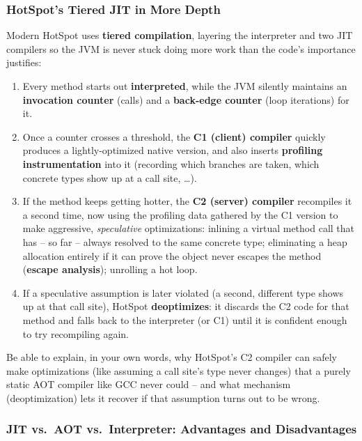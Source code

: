 \documentclass[full-course-notes.tex]{subfiles}
\begin{document}
\subsubsection{HotSpot's Tiered JIT in More Depth}

\dbtag Modern HotSpot uses \textbf{tiered compilation}, layering the interpreter and two JIT
compilers so the JVM is never stuck doing more work than the code's importance justifies:

\begin{enumerate}
  \item Every method starts out \textbf{interpreted}, while the JVM silently maintains an
  \textbf{invocation counter} (calls) and a \textbf{back-edge counter} (loop iterations) for it.
  \item Once a counter crosses a threshold, the \textbf{C1 (client) compiler} quickly produces a
  lightly-optimized native version, and also inserts \textbf{profiling instrumentation} into it
  (recording which branches are taken, which concrete types show up at a call site, \dots).
  \item If the method keeps getting hotter, the \textbf{C2 (server) compiler} recompiles it a
  second time, now using the profiling data gathered by the C1 version to make aggressive,
  \emph{speculative} optimizations: inlining a virtual method call that has -- so far -- always
  resolved to the same concrete type; eliminating a heap allocation entirely if it can prove the
  object never escapes the method (\textbf{escape analysis}); unrolling a hot loop.
  \item If a speculative assumption is later violated (a second, different type shows up at that
  call site), HotSpot \textbf{deoptimizes}: it discards the C2 code for that method and falls
  back to the interpreter (or C1) until it is confident enough to try recompiling again.
\end{enumerate}

\begin{examfocus}
Be able to explain, in your own words, why HotSpot's C2 compiler can safely make optimizations
(like assuming a call site's type never changes) that a purely static AOT compiler like GCC
never could -- and what mechanism (deoptimization) lets it recover if that assumption turns out
to be wrong.
\end{examfocus}

\subsubsection{JIT vs.\ AOT vs.\ Interpreter: Advantages and Disadvantages}
\end{document}
